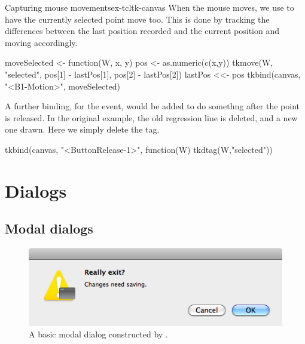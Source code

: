 \begin{example}{Capturing mouse movements}{ex-tcltk-canvas}
When the mouse moves, we use  to have the currently
selected point move too. This is done by tracking the differences
between the last position recorded and the current position and moving
accordingly.
\begin{Schunk}
\begin{Sinput}
 moveSelected <- function(W, x, y) {
   pos <- as.numeric(c(x,y))
   tkmove(W, "selected", pos[1] - lastPos[1], 
                         pos[2] - lastPos[2])
   lastPos <<- pos
 }
 tkbind(canvas, "<B1-Motion>", moveSelected)
\end{Sinput}
\end{Schunk}

A further binding, for the  event, would be
added to do somethng after the point is released. In the original
example, the old regression line is deleted, and a new one drawn. Here
we simply delete the  tag.
\begin{Schunk}
\begin{Sinput}
 tkbind(canvas, "<ButtonRelease-1>", 
        function(W) tkdtag(W,"selected"))
\end{Sinput}
\end{Schunk}


\end{example}



\section{Dialogs}
\label{sec:tcltk:dialogs}
\subsection{Modal dialogs}
\label{sec:modal-dialogs}

\begin{figure}
  \centering
  \includegraphics[width=.6\textwidth]{fig-tcltk-confirm-dialog.png}
  \caption{A basic modal dialog constructed by .}
  \label{fig:fig-tcltk-confirm-dialog}
\end{figure}

